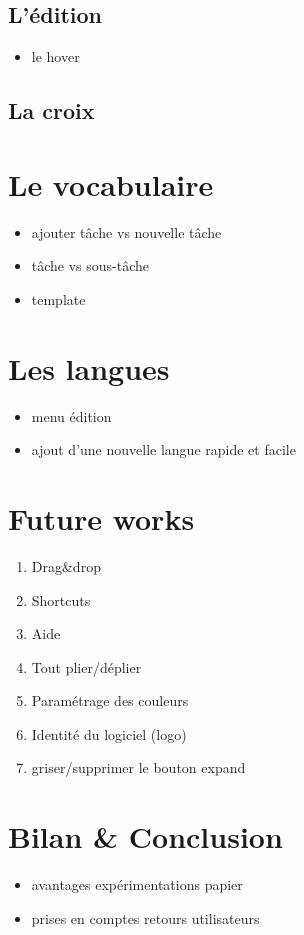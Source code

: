 \documentclass[11pt]{article}
\begin{document}
\subsection[L'édition]{L'édition}
\label{sec-5-2}
\begin{itemize}
\item le hover
\end{itemize}
\subsection[La croix]{La croix}
\label{sec-5-3}
\section[Le vocabulaire]{Le vocabulaire}
\label{sec-6}

\begin{itemize}
\item ajouter tâche vs nouvelle tâche
\item tâche vs sous-tâche
\item template
\end{itemize}
\section[Les langues]{Les langues}
\label{sec-7}
\begin{itemize}
\item menu édition
\item ajout d'une nouvelle langue rapide et facile
\end{itemize}
\section[Future works]{Future works}
\label{sec-8}
\begin{enumerate}
\item Drag\&drop
\item Shortcuts
\item Aide
\item Tout plier/déplier
\item Paramétrage des couleurs
\item Identité du logiciel (logo)
\item griser/supprimer le bouton expand
\end{enumerate}
\section[Bilan \& Conclusion]{Bilan \& Conclusion}
\label{sec-9}
\begin{itemize}
\item avantages expérimentations papier
\item prises en comptes retours utilisateurs
\end{itemize}
\end{document}
